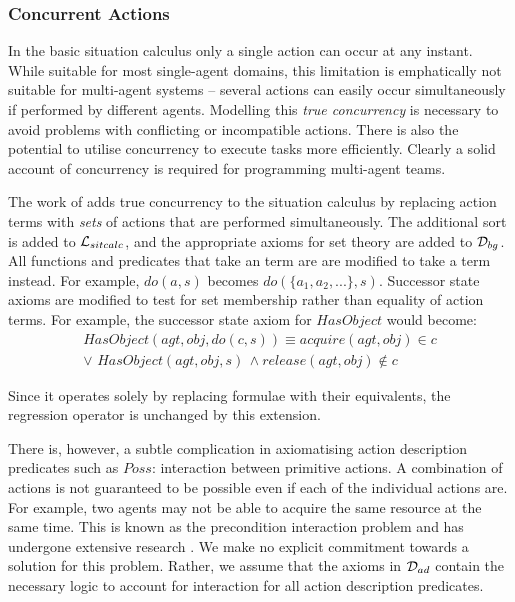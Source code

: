 \subsubsection{Concurrent Actions}

\label{sec:Background:Concurrent-Actions}

In the basic situation calculus only a single action can occur at
any instant. While suitable for most single-agent domains, this limitation
is emphatically not suitable for multi-agent systems -- several actions
can easily occur simultaneously if performed by different agents.
Modelling this \emph{true concurrency} is necessary to avoid problems
with conflicting or incompatible actions. There is also the potential
to utilise concurrency to execute tasks more efficiently. Clearly
a solid account of concurrency is required for programming multi-agent
teams.

The work of \citep{lin92sc_conc,pinto94temporal,reiter96sc_nat_conc}
adds true concurrency to the situation calculus by replacing action
terms with \emph{sets} of actions that are performed simultaneously.
The additional sort  is added to $\mathcal{L}_{sitcalc}$, and the
appropriate axioms for set theory are added to $\mathcal{D}_{bg}$. All functions
and predicates that take an  term are are modified to
take a  term instead. For example, $do(a,s)$ becomes
$do(\{a_{1},a_{2},...\},s)$. Successor state axioms are modified
to test for set membership rather than equality of action terms. For
example, the successor state axiom for $HasObject$ would become:\begin{multline*}
HasObject(agt,obj,do(c,s))\equiv acquire(agt,obj)\in c\\
\vee\,\, HasObject(agt,obj,s)\,\wedge release(agt,obj)\not\in c\end{multline*}


Since it operates solely by replacing formulae with their equivalents,
the regression operator is unchanged by this extension.

There is, however, a subtle complication in axiomatising action description
predicates such as $Poss$: interaction between primitive actions.
A combination of actions is not guaranteed to be possible even if
each of the individual actions are. For example, two agents may not
be able to acquire the same resource at the same time. This is known
as the precondition interaction problem and has undergone extensive
research \citep{pinto94temporal,pinto98interacting_effects,pinto00action_interaction}.
We make no explicit commitment towards a solution for this problem.
Rather, we assume that the axioms in $\mathcal{D}_{ad}$ contain the necessary
logic to account for interaction for all action description predicates.

